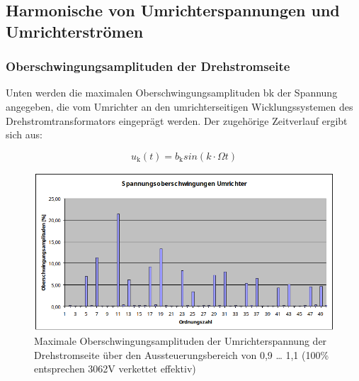\subsection{Harmonische von Umrichterspannungen und Umrichterströmen}
\subsubsection{Oberschwingungsamplituden der Drehstromseite}
Unten werden die maximalen Oberschwingungsamplituden bk der Spannung angegeben, die vom Umrichter an den umrichterseitigen Wicklungssystemen des Drehstromtransformators eingeprägt werden. Der zugehörige Zeitverlauf ergibt sich aus:

\begin{equation*}
    u_\mathrm{k}(t)=b_\mathrm{k}sin(k\cdot \Omega t)
\end{equation*}

\begin{figure}[htb]
    \centering
    \includegraphics[width=\textwidth]{Bilder/spannungsoberschwingung_umrichter.png}
    \caption{Maximale Oberschwingungsamplituden der Umrichterspannung der Drehstromseite über den Aussteuerungsbereich von 0,9 … 1,1 (100\% entsprechen 3062V verkettet effektiv)}
\end{figure}

